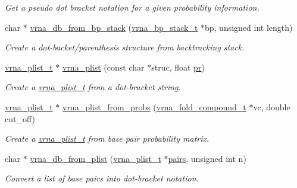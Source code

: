 \begin{DoxyCompactItemize}
\begin{DoxyCompactList}\small\item\em Get a pseudo dot bracket notation for a given probability information. \end{DoxyCompactList}\item 
char $\ast$ \hyperlink{group__struct__utils_ga27bea2c241564af53a065982183389df}{vrna\+\_\+db\+\_\+from\+\_\+bp\+\_\+stack} (\hyperlink{group__data__structures_gaa651bda42e7692f08cb603cd6834b0ee}{vrna\+\_\+bp\+\_\+stack\+\_\+t} $\ast$bp, unsigned int length)
\begin{DoxyCompactList}\small\item\em Create a dot-\/backet/parenthesis structure from backtracking stack. \end{DoxyCompactList}\item 
\hyperlink{group__data__structures_ga8e4eb5e1bfc95776559575beb359af87}{vrna\+\_\+plist\+\_\+t} $\ast$ \hyperlink{group__struct__utils_gad4448f5d2c2da0e4ab1731a3586b2542}{vrna\+\_\+plist} (const char $\ast$struc, float \hyperlink{fold__vars_8h_ac98ec419070aee6831b44e5c700f090f}{pr})
\begin{DoxyCompactList}\small\item\em Create a \hyperlink{group__data__structures_ga8e4eb5e1bfc95776559575beb359af87}{vrna\+\_\+plist\+\_\+t} from a dot-\/bracket string. \end{DoxyCompactList}\item 
\hyperlink{group__data__structures_ga8e4eb5e1bfc95776559575beb359af87}{vrna\+\_\+plist\+\_\+t} $\ast$ \hyperlink{group__struct__utils_gaa3bf26a0ee2e9f2225afbaee44a37264}{vrna\+\_\+plist\+\_\+from\+\_\+probs} (\hyperlink{group__fold__compound_ga1b0cef17fd40466cef5968eaeeff6166}{vrna\+\_\+fold\+\_\+compound\+\_\+t} $\ast$vc, double cut\+\_\+off)
\begin{DoxyCompactList}\small\item\em Create a \hyperlink{group__data__structures_ga8e4eb5e1bfc95776559575beb359af87}{vrna\+\_\+plist\+\_\+t} from base pair probability matrix. \end{DoxyCompactList}\item 
char $\ast$ \hyperlink{group__struct__utils_gab6a7a36c90836880f7ab09b9f6baf1af}{vrna\+\_\+db\+\_\+from\+\_\+plist} (\hyperlink{group__data__structures_ga8e4eb5e1bfc95776559575beb359af87}{vrna\+\_\+plist\+\_\+t} $\ast$\hyperlink{group__struct__utils_ga6341cbb704924824e0236c1dce791032}{pairs}, unsigned int n)
\begin{DoxyCompactList}\small\item\em Convert a list of base pairs into dot-\/bracket notation. \end{DoxyCompactList}\item 

\end{DoxyCompactItemize}
